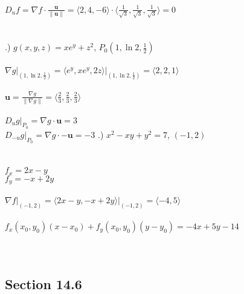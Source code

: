 \documentclass[12pt]{article}
\begin{document}
\noindent $D_{u}f = \nabla f \cdot \frac{\mathbf{u}}{\| \mathbf{u} \|} = \langle 2, 4, -6\rangle \cdot \langle\frac{1}{\sqrt{3}}, \frac{1}{\sqrt{3}}, \frac{1}{\sqrt{3}} \rangle = 0$\\\\\\
.) $g(x,y,z) = xe^{y} + z^{2}$, \hspace{10pt} $P_{0}(1,\ln{2}, \frac{1}{2})$\\\\
\noindent $\nabla g \Big|_{(1, \ln{2}, \frac{1}{2})} = \langle e^{y}, xe^{y}, 2z \rangle \Big|_{(1, \ln{2}, \frac{1}{2})} = \langle 2, 2, 1\rangle$\\\\
\noindent $\mathbf{u} = \frac{\nabla g}{\| \nabla g \|} = \langle \frac{2}{3}, \frac{2}{3}, \frac{2}{3}\rangle$\\\\
\noindent $D_{u}g\Big|_{P_{0}} = \nabla g \cdot \mathbf{u} = 3$\\
\noindent $D_{-u}g\Big|_{P_{0}} = \nabla g \cdot -\mathbf{u} = -3$\clearpage
{}.) $x^{2} -xy + y^{2} = 7$, \hspace{10pt} $(-1, 2)$ \\\\\\
\noindent $f_{x} = 2x - y$\\
\noindent $f_{y} = -x + 2y$\\\\
\noindent $\nabla f \Big|_{(-1, 2)} = \langle 2x-y, -x+2y\rangle \Big|_{(-1, 2)} = \langle -4, 5\rangle$ \\\\
\noindent $f_{x}(x_{0}, y_{0})(x-x_{0}) + f_{y}(x_{0}, y_{0})(y-y_{0}) = -4x + 5y - 14$\\\\\\




\subsection*{Section 14.6}
\end{document}
